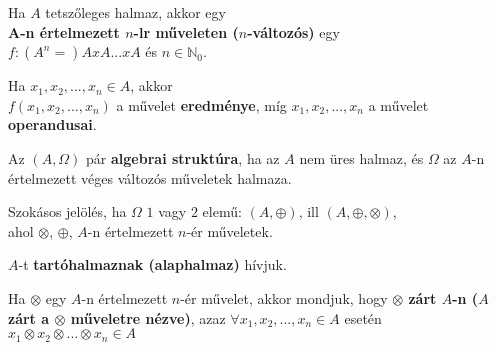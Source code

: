 \begin{frame}
\begin{tcolorbox}[title={Def.:Algebrai struktúrák, izomorfiájuk}]
Ha $A$ tetszőleges halmaz, akkor egy\\
\textbf{A-n értelmezett $n$-lr műveleten ($n$-változós)} egy\\
$f : (A^n =) A x A ... x A$ és $n \in \mathbb{N}_0$.\\
\msmallskip

Ha $x_1, x_2, ..., x_n\in A$, akkor\\
$f(x_1, x_2, ..., x_n)$ a művelet \textbf{eredménye}, míg $x_1, x_2, ..., x_n$ a művelet \textbf{operandusai}.\\
\msmallskip

Az $(A, {\Omega})$ pár \textbf{algebrai struktúra}, ha az $A$ nem üres halmaz, és $\Omega$ az $A$-n értelmezett véges változós műveletek halmaza.\\
\msmallskip

Szokásos jelölés, ha $\Omega$ $1$ vagy $2$ elemű: $(A, {\oplus})$, ill $(A, {\oplus}, {\otimes})$,\\
ahol $\otimes$, $\oplus$, $A$-n értelmezett $n$-ér műveletek.\\
\msmallskip

$A$-t \textbf{tartóhalmaznak (alaphalmaz)} hívjuk.
\end{tcolorbox}

\begin{tcolorbox}[title={Def.: Műveleti zártság}]
Ha $\otimes$ egy $A$-n értelmezett $n$-ér művelet, akkor mondjuk, hogy \textbf{${\otimes}$ zárt $A$-n ($A$ zárt a ${\otimes}$ műveletre nézve)}, azaz ${\forall}x_1, x_2, ..., x_n \in A$ esetén $x_1 \otimes x_2 \otimes ... \otimes x_n \in A$
\end{tcolorbox}
\end{frame}


